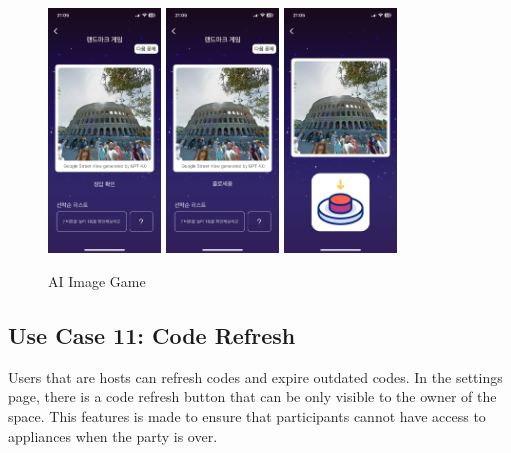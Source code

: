 \documentclass[conference]{IEEEtran}
\begin{document}
        \begin{figure}[htbp]
            \centerline{\includegraphics[width=3cm]{Images/screen/game/geo/GEO3_HOST.PNG}
            \includegraphics[width=3cm]{Images/screen/game/geo/GEO3_ANSWER.PNG}
             \includegraphics[width=3cm]{Images/screen/game/geo/GEO3_PLAYER.PNG}}
            \caption{AI Image Game}
            \label{fig}
        \end{figure}
    \subsection{Use Case 11: Code Refresh}
        Users that are hosts can refresh codes and expire outdated codes. In the settings page, there is a code refresh button that can be only visible to the owner of the space. This features is made to ensure that participants cannot have access to appliances when the party is over.\\
        \newpage
        
\end{document}

